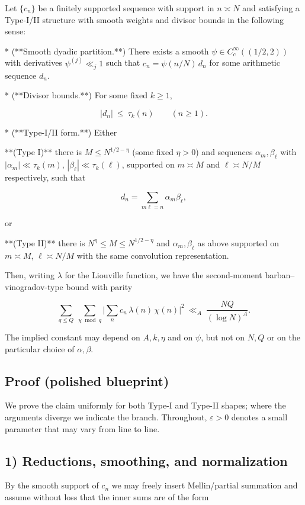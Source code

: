 \documentclass[11pt]{article}
\theoremstyle{definition}
\theoremstyle{remark}
\begin{document}
Let $\{c_n\}$ be a finitely supported sequence with support in $n\asymp N$ and satisfying a Type-I/II structure with smooth weights and divisor bounds in the following sense:

* (**Smooth dyadic partition.**) There exists a smooth $\psi\in C_c^\infty((1/2,2))$ with derivatives $\psi^{(j)}\ll_j 1$ such that $c_n=\psi(n/N)\,d_n$ for some arithmetic sequence $d_n$.

* (**Divisor bounds.**) For some fixed $k\ge 1$,

$$
|d_n|\ \le\ \tau_k(n)\qquad (n\ge 1).
$$

* (**Type-I/II form.**) Either

  **(Type I)** there is $M\le N^{1/2-\eta}$ (some fixed $\eta>0$) and sequences $\alpha_m,\beta_\ell$ with $|\alpha_m|\ll \tau_k(m)$, $|\beta_\ell|\ll \tau_k(\ell)$, supported on $m\asymp M$ and $\ell\asymp N/M$ respectively, such that

  $$
  d_n=\sum_{m\ell=n}\alpha_m\beta_\ell,
  $$

  or

  **(Type II)** there is $N^{\eta}\le M\le N^{1/2-\eta}$ and $\alpha_m,\beta_\ell$ as above supported on $m\asymp M$, $\ell\asymp N/M$ with the same convolution representation.

Then, writing $\lambda$ for the Liouville function, we have the second-moment barban–vinogradov-type bound with parity

$$
\sum_{q\le Q}\ \sum_{\chi\bmod q}
\Bigg|\sum_{n} c_n\,\lambda(n)\,\chi(n)\Bigg|^2
\ \ll_A\ \frac{NQ}{(\log N)^A}.
$$

The implied constant may depend on $A,k,\eta$ and on $\psi$, but not on $N,Q$ or on the particular choice of $\alpha,\beta$.

\subsection*{Proof (polished blueprint)}

We prove the claim uniformly for both Type-I and Type-II shapes; where the arguments diverge we indicate the branch. Throughout, $\varepsilon>0$ denotes a small parameter that may vary from line to line.

\subsection*{1) Reductions, smoothing, and normalization}

By the smooth support of $c_n$ we may freely insert Mellin/partial summation and assume without loss that the inner sums are of the form
\end{document}
